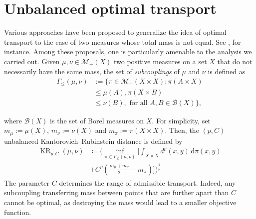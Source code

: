 \documentclass{article}
\theoremstyle{plain}
\theoremstyle{definition}
\theoremstyle{remark}
\begin{document}
\section{Unbalanced optimal transport}
\label{sec: Unbalanced}

Various approaches have been proposed to generalize the idea of optimal transport to the case of two measures whose total mass is not equal.
See \citet{CaffarelliMcCann2010,LieroMielkeSavare2018, Figalli2010}, for instance.
Among these proposals, one is particularly amenable to the analysis we carried out.
Given $\mu, \nu \in \mathcal{M}_+(X) $ two positive measures on a set $X$ that do not necessarily have the same mass, the set of \emph{subcouplings} of $\mu$ and $\nu$ is defined as 
\begin{align}
    \Gamma_{\le}(\mu, \nu) &:=\{ \pi \in \mathcal{M}_+(X\times X) : \pi ( A \times X) 
    \\&\le \mu(A), \pi(X \times B) \nonumber
    \\&\le \nu (B) , \text{ for all } A,B \in \mathcal{B}(X)    \}, \nonumber
\end{align}

where $\mathcal{B}(X)$ is the set of Borel measures on $X$. For simplicity, set  $m_\mu := \mu(X)$, $m_\nu:=\nu(X)$ and $m_\pi := \pi(X\times X)$.
Then, the $(p,C)$ unbalanced Kantorovich--Rubinstein distance is defined by 
\begin{align}
\label{eq: KRC}
\operatorname{KR}_{p,C}(\mu, \nu)
&\coloneqq \bigg( \inf_{\pi \in \Gamma_{\le}(\mu, \nu)} \bigg[ \int_{X\times X} d^p(x,y) \, \mathrm{d} \pi(x,y) \nonumber 
\\
&+ 
C^p \left( \tfrac{m_\mu+m_\nu}{2}-m_\pi\right) \bigg] \bigg)^{\frac{1}{p}}
\end{align}
The parameter $C$ determines the range of admissible transport. Indeed, any subcoupling transferring mass between points that are further apart than $C$ cannot be optimal, as destroying the mass would lead to a smaller objective function.
\end{document}

